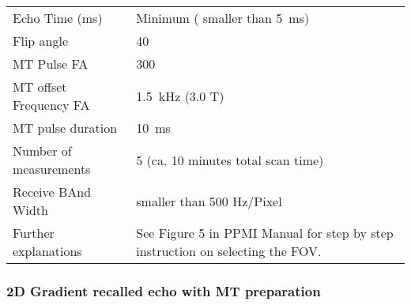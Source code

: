 \begin{table}[H]
\begin{tabularx}{\linewidth}{@{} s | X @{}}
Echo Time (ms)                                                                        & Minimum ( smaller than \SI{5}{\milli\second})                                          \\
Flip angle                                                                                 	& 40                                          \\
MT Pulse FA									& 300 					\\
MT offset Frequency FA						& \SI{1.5}{\kilo\hertz} (3.0 T)\\
MT pulse duration 								& \SI{10}{\milli\second}\\
Number of measurements                                                  & 5 (ca. 10 minutes total scan time)                 \\
Receive BAnd Width 							& smaller than 500 Hz/Pixel 	\\
Further explanations                                                             & See Figure 5 in PPMI Manual for step by step instruction on selecting the FOV.\\
\bottomrule
\end{tabularx}

\subsubsection{2D Gradient recalled echo with MT preparation}


\end{table}
